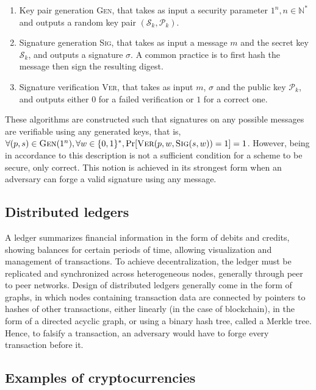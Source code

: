 \documentclass[12pt]{article}
\newcommand{\pk}{\mathcal{P}_{k}}
\newcommand{\sk}{\mathcal{S}_{k}}
\newcommand{\binwds}[1]{\{0, 1\}^{#1}}
\begin{document}
\begin{enumerate}[label=(\roman*)]
  \item Key pair generation \textsc{Gen}, that takes as input a security
    parameter $1^{n}, n \in \mathbb{N}^{*}$ and outputs a random key pair
    $(\sk{}, \pk{})$.
  \item Signature generation \textsc{Sig}, that takes as input a message $m$
    and the secret key $\sk{}$, and outputs a signature $\sigma$. A common
    practice is to first hash the message then sign the resulting digest.
  \item Signature verification \textsc{Ver}, that takes as input $m$, $\sigma$
    and the public key $\pk{}$, and outputs either $0$ for a failed
    verification or $1$ for a correct one.
\end{enumerate}

These algorithms are constructed such that signatures on any possible messages
are verifiable using any generated keys, that is,
$\forall (p, s) \in \textsc{Gen}(1^{n}), \forall w \in \binwds{*},
\text{Pr}[\textsc{Ver}(p, w, \textsc{Sig}(s, w)) = 1] = 1$. However, being in
accordance to this description is not a sufficient condition for a scheme to
be secure, only correct. This notion is achieved in its strongest form when an
adversary can forge a valid signature using any message.

\subsection*{Distributed ledgers}

A ledger summarizes financial information in the form of debits and credits,
showing balances for certain periods of time, allowing visualization and
management of transactions. To achieve decentralization, the ledger must be
replicated and synchronized across heterogeneous nodes, generally through peer
to peer networks. Design of distributed ledgers generally come in the form of
graphs, in which nodes containing transaction data are connected by pointers to
hashes of other transactions, either linearly (in the case of blockchain), in
the form of a directed acyclic graph, or using a binary hash tree, called a
Merkle tree. Hence, to falsify a transaction, an adversary would have to forge
every transaction before it.

\subsection*{Examples of cryptocurrencies}
\end{document}
